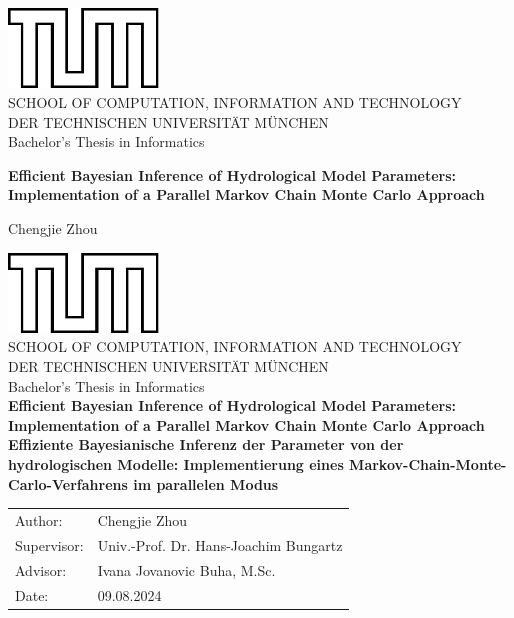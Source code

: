 \documentclass[11pt,
               a4paper,
               bibtotoc,
               idxtotoc,
               headsepline,
               footsepline,
               footexclude,
               BCOR12mm,
               DIV13,
               openany,   %
               ]
               {scrbook}
\def\doctype{Bachelor's Thesis\xspace}
\def\studyProgram{Informatics}
\def\title{Efficient Bayesian Inference of Hydrological Model Parameters: Implementation of a Parallel Markov Chain Monte Carlo Approach}
\def\titleGer{Effiziente Bayesianische Inferenz der Parameter von der hydrologischen Modelle: Implementierung eines Markov-Chain-Monte-Carlo-Verfahrens im parallelen Modus}
\def\author{Chengjie Zhou}
\def\supervisor{Univ.-Prof. Dr. Hans-Joachim Bungartz}
\def\advisor{Ivana Jovanovic Buha, M.Sc.}
\def\date{09.08.2024}
\begin{document}
\frontmatter

\def\bcorcor{0.15cm}
\addtolength{\hoffset}{\bcorcor}
\thispagestyle{empty}
\vspace{4cm}
\begin{center}
    \includegraphics[width=4cm]{templateStuff/tumlogo.pdf}\\[5mm]
    \huge SCHOOL OF COMPUTATION, INFORMATION AND TECHNOLOGY\\[5mm]
    \large DER TECHNISCHEN UNIVERSITÄT MÜNCHEN\\[24mm]

    {\Large \doctype in \studyProgram}\\[20mm]
    {\huge\bf \title\par}
    \vspace{15mm}
    {\LARGE  \author}
\end{center}

\cleardoubleemptypage


\def\bcorcor{0.15cm}
\addtolength{\hoffset}{\bcorcor}
\thispagestyle{empty}
\vspace{10mm}
\begin{center}
    \includegraphics[width=4cm]{templateStuff/tumlogo.pdf}\\[5mm]
	\huge SCHOOL OF COMPUTATION, INFORMATION AND TECHNOLOGY\\[5mm]
	\large DER TECHNISCHEN UNIVERSITÄT MÜNCHEN\\[24mm]
	{\Large \doctype in \studyProgram}\\[20mm]
	{\LARGE\bf \title}\\[10mm]
	{\LARGE\bf \titleGer}\\[10mm]
	\begin{tabular}{ll}
		\Large Author:      	& \Large \author \\[2mm]
		\Large Supervisor:  	& \Large \supervisor\\[2mm]
		\Large Advisor:			& \Large \advisor\\[2mm]
		\Large Date:       		& \Large \date
	\end{tabular}
\end{center}
\end{document}
